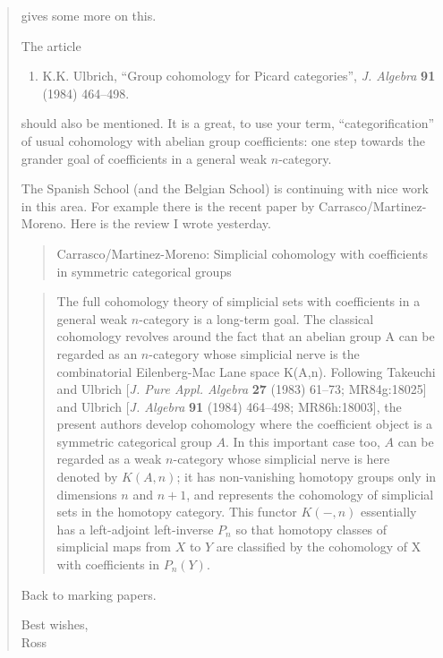 \documentclass{article}
\def\tightlist{}
\begin{document}
\begin{quote}
gives some more on this.

The article

\begin{enumerate}
\def\labelenumi{\arabic{enumi})}
\setcounter{enumi}{43}
\tightlist
\item
  K.K. Ulbrich, ``Group cohomology for Picard categories'', \emph{J.
  Algebra} \textbf{91} (1984) 464--498.
\end{enumerate}

should also be mentioned. It is a great, to use your term,
``categorification'' of usual cohomology with abelian group
coefficients: one step towards the grander goal of coefficients in a
general weak \(n\)-category.

The Spanish School (and the Belgian School) is continuing with nice work
in this area. For example there is the recent paper by
Carrasco/Martinez-Moreno. Here is the review I wrote yesterday.

\begin{quote}
Carrasco/Martinez-Moreno: Simplicial cohomology with coefficients in
symmetric categorical groups
\end{quote}

\begin{quote}
The full cohomology theory of simplicial sets with coefficients in a
general weak \(n\)-category is a long-term goal. The classical
cohomology revolves around the fact that an abelian group A can be
regarded as an \(n\)-category whose simplicial nerve is the
combinatorial Eilenberg-Mac Lane space K(A,n). Following Takeuchi and
Ulbrich {[}\emph{J. Pure Appl. Algebra} \textbf{27} (1983) 61--73;
MR84g:18025{]} and Ulbrich {[}\emph{J. Algebra} \textbf{91} (1984)
464--498; MR86h:18003{]}, the present authors develop cohomology where
the coefficient object is a symmetric categorical group \(A\). In this
important case too, \(A\) can be regarded as a weak \(n\)-category whose
simplicial nerve is here denoted by \(K(A,n)\); it has non-vanishing
homotopy groups only in dimensions \(n\) and \(n+1\), and represents the
cohomology of simplicial sets in the homotopy category. This functor
\(K(-,n)\) essentially has a left-adjoint left-inverse \(P_n\) so that
homotopy classes of simplicial maps from \(X\) to \(Y\) are classified
by the cohomology of X with coefficients in \(P_n(Y)\).
\end{quote}

Back to marking papers.

Best wishes,\\
Ross
\end{quote}
\end{document}
